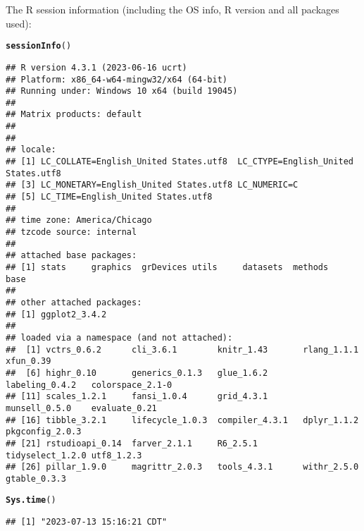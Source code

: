 \documentclass{article}\usepackage[]{graphicx}\usepackage[]{xcolor}
\makeatletter
\newcommand{\hlstd}[1]{\textcolor[rgb]{0.345,0.345,0.345}{#1}}%
\newcommand{\hlkwd}[1]{\textcolor[rgb]{0.737,0.353,0.396}{\textbf{#1}}}%
\newenvironment{kframe}{%
 \def\at@end@of@kframe{}%
 \ifinner\ifhmode%
  \def\at@end@of@kframe{\end{minipage}}%
  \begin{minipage}{\columnwidth}%
 \fi\fi%
 \def\FrameCommand##1{\hskip\@totalleftmargin \hskip-\fboxsep
 \colorbox{shadecolor}{##1}\hskip-\fboxsep
     \hskip-\linewidth \hskip-\@totalleftmargin \hskip\columnwidth}%
 \MakeFramed {\advance\hsize-\width
   \@totalleftmargin\z@ \linewidth\hsize
   \@setminipage}}%
 {\par\unskip\endMakeFramed%
 \at@end@of@kframe}
\newenvironment{knitrout}{}{} %
\makeatother
\begin{document}
The R session information (including the OS info, R version and all
packages used):

\begin{knitrout}
\color{fgcolor}\begin{kframe}
\begin{alltt}
\hlkwd{sessionInfo}\hlstd{()}
\end{alltt}
\begin{verbatim}
## R version 4.3.1 (2023-06-16 ucrt)
## Platform: x86_64-w64-mingw32/x64 (64-bit)
## Running under: Windows 10 x64 (build 19045)
## 
## Matrix products: default
## 
## 
## locale:
## [1] LC_COLLATE=English_United States.utf8  LC_CTYPE=English_United States.utf8   
## [3] LC_MONETARY=English_United States.utf8 LC_NUMERIC=C                          
## [5] LC_TIME=English_United States.utf8    
## 
## time zone: America/Chicago
## tzcode source: internal
## 
## attached base packages:
## [1] stats     graphics  grDevices utils     datasets  methods   base     
## 
## other attached packages:
## [1] ggplot2_3.4.2
## 
## loaded via a namespace (and not attached):
##  [1] vctrs_0.6.2      cli_3.6.1        knitr_1.43       rlang_1.1.1      xfun_0.39       
##  [6] highr_0.10       generics_0.1.3   glue_1.6.2       labeling_0.4.2   colorspace_2.1-0
## [11] scales_1.2.1     fansi_1.0.4      grid_4.3.1       munsell_0.5.0    evaluate_0.21   
## [16] tibble_3.2.1     lifecycle_1.0.3  compiler_4.3.1   dplyr_1.1.2      pkgconfig_2.0.3 
## [21] rstudioapi_0.14  farver_2.1.1     R6_2.5.1         tidyselect_1.2.0 utf8_1.2.3      
## [26] pillar_1.9.0     magrittr_2.0.3   tools_4.3.1      withr_2.5.0      gtable_0.3.3
\end{verbatim}
\begin{alltt}
\hlkwd{Sys.time}\hlstd{()}
\end{alltt}
\begin{verbatim}
## [1] "2023-07-13 15:16:21 CDT"
\end{verbatim}
\end{kframe}
\end{knitrout}
\end{document}
